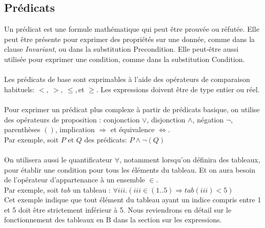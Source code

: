 \subsection{Prédicats}

Un prédicat est une formule mathématique qui peut être prouvée ou
réfutée. Elle peut être présente pour exprimer des propriétés sur une
donnée, comme dans la clause \emph{Invariant}, ou dans la substitution
Precondition. Elle peut-être aussi utilisée pour exprimer une
condition, comme dans la substitution Condition.

\paragraph{}
Les prédicats de base sont exprimables à l'aide des opérateurs de
comparaison habituels: $<,~>,~\leq,$et $\geq$. Les expressions doivent
être de type entier ou réel.

\paragraph{}
Pour exprimer un prédicat plus complexe à partir de prédicats basique,
on utilise des opérateurs de proposition : conjonction $\vee$,
disjonction $\wedge$, négation $\neg$, parenthèses $()$, implication
$\Rightarrow$ et équivalence $\Leftrightarrow$.\\
Par exemple, soit $P$ et $Q$ des prédicats: $P\wedge\neg(Q)$

\paragraph{}
On utilisera aussi le quantificateur $\forall$, notamment lorsqu'on
définira des tableaux, pour établir une condition pour tous les
éléments du tableau. Et on aura besoin de l'opérateur d'appartenance à
un ensemble $\in$.\\
Par exemple, soit $tab$ un tableau : $\forall iii . (iii \in (1..5)
\Rightarrow tab(iii) < 5)$\\
Cet exemple indique que tout élément du tableau ayant un indice compris
entre 1 et 5 doit être strictement inférieur à 5. Nous reviendrons en
détail sur le fonctionnement des tableaux en B dans la section sur les
expressions.



